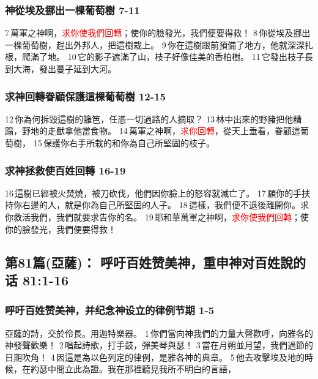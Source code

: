 \subsubsection{神從埃及挪出一棵葡萄樹 7-11}
7 萬軍之神啊，\textcolor{red}{求你使我們回轉}；使你的臉發光，我們便要得救！
8 你從埃及挪出一棵葡萄樹，趕出外邦人，把這樹栽上。
9 你在這樹跟前預備了地方，他就深深扎根，爬滿了地。
10 它的影子遮滿了山，枝子好像佳美的香柏樹。
11 它發出枝子長到大海，發出蔓子延到大河。

\subsubsection{求神回轉眷顧保護這棵葡萄樹 12-15}
12 你為何拆毀這樹的籬笆，任憑一切過路的人摘取？
13 林中出來的野豬把他糟蹋，野地的走獸拿他當食物。
14 萬軍之神啊，\textcolor{red}{求你回轉}，從天上垂看，眷顧這葡萄樹，
15 保護你右手所栽的和你為自己所堅固的枝子。

\subsubsection{求神拯救使百姓回轉 16-19}
16 這樹已經被火焚燒，被刀砍伐，他們因你臉上的怒容就滅亡了。
17 願你的手扶持你右邊的人，就是你為自己所堅固的人子。
18 這樣，我們便不退後離開你。求你救活我們，我們就要求告你的名。
19 耶和華萬軍之神啊，\textcolor{red}{求你使我們回轉}；使你的臉發光，我們便要得救！


\subsection{第81篇(亞薩)： 呼吁百姓赞美神，重申神对百姓說的话  81:1-16}
\subsubsection{呼吁百姓赞美神，并纪念神设立的律例节期 1-5}
亞薩的詩，交於伶長。用迦特樂器。
1 你們當向神我們的力量大聲歡呼，向雅各的神發聲歡樂！
2 唱起詩歌，打手鼓，彈美琴與瑟！
3 當在月朔並月望，我們過節的日期吹角！
4 因這是為以色列定的律例，是雅各神的典章。
5 他去攻擊埃及地的時候，在約瑟中間立此為證。我在那裡聽見我所不明白的言語，

